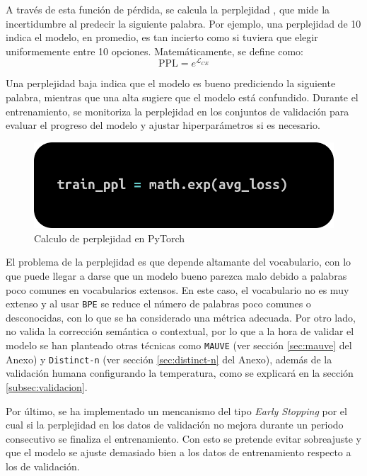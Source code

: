 \documentclass[11pt]{book}
\begin{document}
A través de esta función de pérdida, se calcula la perplejidad \parencite{keerthanams2025evaluating}, que mide la incertidumbre al predecir la siguiente palabra. Por ejemplo, una perplejidad de 10 indica el modelo, en promedio, es tan incierto como si tuviera que elegir uniformemente entre 10 opciones. Matemáticamente, se define como:
\[
\text{PPL} = e^{\mathcal{L}_{CE}}
\]

Una perplejidad baja indica que el modelo es bueno prediciendo la siguiente palabra, mientras que una alta sugiere que el modelo está confundido. Durante el entrenamiento, se monitoriza la perplejidad en los conjuntos de validación para evaluar el progreso del modelo y ajustar hiperparámetros si es necesario.

\begin{figure}[h]
    \centering
    \includegraphics[width=0.5\linewidth]{img/perplexity.png}
    \caption{Calculo de perplejidad en PyTorch \parencite{stackoverflow_perplexity_pytorch}}
    \label{fig:placeholder21}
\end{figure}

El problema de la perplejidad \parencite{singh2024perplexitymatters} es que depende altamante del vocabulario, con lo que puede llegar a darse que un modelo bueno parezca malo debido a palabras poco comunes en vocabularios extensos. En este caso, el vocabulario no es muy extenso y al usar \texttt{BPE} se reduce el número de palabras poco comunes o desconocidas, con lo que se ha considerado una métrica adecuada. Por otro lado, no valida la corrección semántica o contextual, por lo que a la hora de validar el modelo se han planteado otras técnicas como \texttt{MAUVE} \parencite{krishnap25_mauve_github} (ver sección \ref{sec:mauve} del Anexo) y \texttt{Distinct-n} (ver sección \ref{sec:distinct-n} del Anexo), además de la validación humana configurando la temperatura, como se explicará en la sección \ref{subsec:validacion}.

Por último, se ha implementado un mencanismo del tipo \textit{Early Stopping} por el cual si la perplejidad en los datos de validación no mejora durante un periodo consecutivo se finaliza el entrenamiento. Con esto se pretende evitar sobreajuste y que el modelo se ajuste demasiado bien a los datos de entrenamiento respecto a los de validación.
\end{document}
